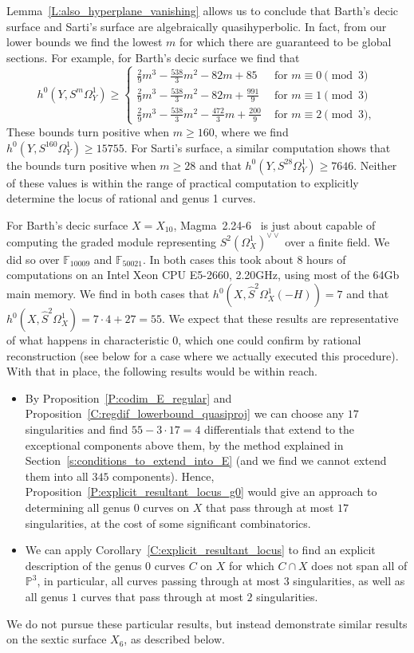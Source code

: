 \documentclass[12pt, reqno]{amsart}
\theoremstyle{definition}
\newcommand{\PP}{{\mathbb P}}
\newcommand{\F}{{\mathbb F}}
\numberwithin{equation}{section}
\numberwithin{table}{section}
\begin{document}
Lemma~\ref{L:also_hyperplane_vanishing} allows us to conclude that Barth's decic surface and Sarti's surface are algebraically quasihyperbolic. In fact, from our lower bounds we find the lowest $m$ for which there are guaranteed to be global sections. For example, for Barth's decic surface we find that 
\[h^0(Y,S^m\Omega^1_Y)\geq \begin{cases}
\frac{2}{9}m^3-\frac{538}{3}m^2-82m+85&\text{ for } m\equiv 0\pmod3\\
\frac{2}{9}m^3-\frac{538}{3}m^2-82m+\frac{991}{9}&\text{ for } m\equiv 1\pmod3\\
\frac{2}{9}m^3-\frac{538}{3}m^2-\frac{472}{3}m+\frac{200}{9}&\text{ for } m\equiv 2\pmod3,
\end{cases}\]
These bounds turn positive when $m\geq160$, where we find $h^0(Y,S^{160}\Omega^1_Y)\geq 15755$. For Sarti's surface, a similar computation shows that the bounds turn positive when $m\geq 28$ and that $h^0(Y,S^{28}\Omega^1_Y)\geq 7646$. Neither of these values is within the range of practical computation to explicitly determine the locus of rational and genus 1 curves.

For Barth's decic surface $X=X_{10}$, Magma~2.24-6~\cite{magma} is just about capable of computing the graded module representing $S^2(\Omega^1_X)^{\vee\vee}$ over a finite field. We did so over $\F_{10009}$ and $\F_{50021}$. In both cases this took about 8 hours of computations on an Intel Xeon CPU E5-2660, 2.20GHz, using most of the 64Gb main memory. We find in both cases that $h^0(X,\hat{S}^2\Omega^1_X (-H))=7$ and that $h^0(X,\hat{S}^2\Omega^1_X)=7\cdot4+27=55$. We expect that these results are representative of what happens in characteristic $0$, which one could confirm by rational reconstruction (see below for a case where we actually executed this procedure). With that in place, the following results would be within reach.
\begin{itemize}
	\item By Proposition~\ref{P:codim_E_regular} and Proposition~\ref{C:regdif_lowerbound_quasiproj} we can choose any $17$ singularities and find $55-3\cdot17=4$ differentials that extend to the exceptional components above them, by the method explained in Section~\ref{s:conditions_to_extend_into_E} (and we find we cannot extend them into all $345$ components). Hence, Proposition~\ref{P:explicit_resultant_locus_g0} would give an approach to determining all genus $0$ curves on $X$ that pass through at most $17$ singularities, at the cost of some significant combinatorics.
	\item We can apply Corollary~\ref{C:explicit_resultant_locus} to find an explicit description of the genus $0$ curves $C$ on $X$ for which $C\cap X$ does not span all of $\PP^3$, in particular, all curves passing through at most $3$ singularities, as well as all genus $1$ curves that pass through at most $2$ singularities.
\end{itemize}
We do not pursue these particular results, but instead demonstrate similar results on the sextic surface $X_6$, as described below.
\end{document}
